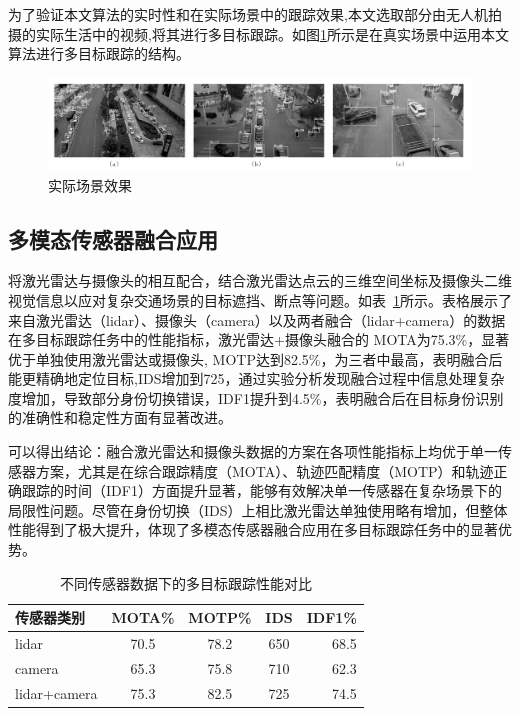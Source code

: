 为了验证本文算法的实时性和在实际场景中的跟踪效果,本文选取部分由无人机拍摄的实际生活中的视频,将其进行多目标跟踪。如图\ref{fig:np18}所示是在真实场景中运用本文算法进行多目标跟踪的结构。

\begin{figure}[htbp] %
	\centering
	\includegraphics[width=1\textwidth]{np18} %
	\caption{实际场景效果} %
	\label{fig:np18} %
\end{figure}


\subsection{多模态传感器融合应用}
将激光雷达与摄像头的相互配合，结合激光雷达点云的三维空间坐标及摄像头二维视觉信息以应对复杂交通场景的目标遮挡、断点等问题。如表~\ref{tab:duibi5}所示。表格展示了来自激光雷达（lidar）、摄像头（camera）以及两者融合（lidar+camera）的数据在多目标跟踪任务中的性能指标，激光雷达+摄像头融合的 MOTA为75.3\%，显著优于单独使用激光雷达或摄像头, MOTP达到82.5\%，为三者中最高，表明融合后能更精确地定位目标,IDS增加到725，通过实验分析发现融合过程中信息处理复杂度增加，导致部分身份切换错误，IDF1提升到4.5\%，表明融合后在目标身份识别的准确性和稳定性方面有显著改进。


可以得出结论：融合激光雷达和摄像头数据的方案在各项性能指标上均优于单一传感器方案，尤其是在综合跟踪精度（MOTA）、轨迹匹配精度（MOTP）和轨迹正确跟踪的时间（IDF1）方面提升显著，能够有效解决单一传感器在复杂场景下的局限性问题。尽管在身份切换（IDS）上相比激光雷达单独使用略有增加，但整体性能得到了极大提升，体现了多模态传感器融合应用在多目标跟踪任务中的显著优势。



\begin{table}[htbp]
	\centering
	\caption{不同传感器数据下的多目标跟踪性能对比}
	\label{tab:duibi5}
	
	\begin{tabular}{@{}lcccr@{}}
		\toprule
		传感器类别 & MOTA\% & MOTP\% & IDS & IDF1\% \\
		\midrule
		lidar      & 70.5 & 78.2 & 650 & 68.5 \\
		camera        & 65.3 & 75.8 & 710 & 62.3 \\
		lidar+camera & 75.3 & 82.5 & 725 & 74.5 \\
		\bottomrule
	\end{tabular}
	
\end{table}


